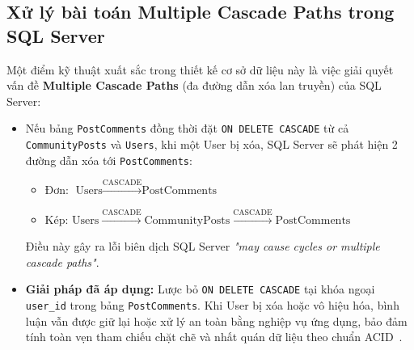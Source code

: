\subsection{Xử lý bài toán Multiple Cascade Paths trong SQL Server}
Một điểm kỹ thuật xuất sắc trong thiết kế cơ sở dữ liệu này là việc giải quyết vấn đề \textbf{Multiple Cascade Paths} (đa đường dẫn xóa lan truyền) của SQL Server:
\begin{itemize}[leftmargin=1.5em,itemsep=2pt,topsep=2pt]
    \item Nếu bảng \texttt{PostComments} đồng thời đặt \texttt{ON DELETE CASCADE} từ cả \texttt{CommunityPosts} và \texttt{Users}, khi một User bị xóa, SQL Server sẽ phát hiện 2 đường dẫn xóa tới \texttt{PostComments}:
    \begin{itemize}[leftmargin=1em,label={--}]
        \item Đơn: $\text{Users} \xrightarrow{\text{CASCADE}} \text{PostComments}$
        \item Kép: $\text{Users} \xrightarrow{\text{CASCADE}} \text{CommunityPosts} \xrightarrow{\text{CASCADE}} \text{PostComments}$
    \end{itemize}
    Điều này gây ra lỗi biên dịch SQL Server \textit{"may cause cycles or multiple cascade paths"}.
    \item \textbf{Giải pháp đã áp dụng:} Lược bỏ \texttt{ON DELETE CASCADE} tại khóa ngoại \texttt{user\_id} trong bảng \texttt{PostComments}. Khi User bị xóa hoặc vô hiệu hóa, bình luận vẫn được giữ lại hoặc xử lý an toàn bằng nghiệp vụ ứng dụng, bảo đảm tính toàn vẹn tham chiếu chặt chẽ và nhất quán dữ liệu theo chuẩn ACID~\cite{silberschatz2020database, microsoft2024locking}.
\end{itemize}